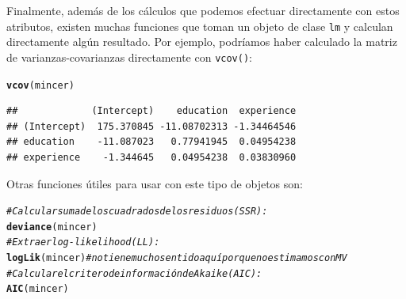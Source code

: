 \documentclass{article}\usepackage[]{graphicx}\usepackage[]{color}
\makeatletter
\newcommand{\hlcom}[1]{\textcolor[rgb]{0.678,0.584,0.686}{\textit{#1}}}%
\newcommand{\hlstd}[1]{\textcolor[rgb]{0.345,0.345,0.345}{#1}}%
\newcommand{\hlkwd}[1]{\textcolor[rgb]{0.737,0.353,0.396}{\textbf{#1}}}%
\newenvironment{kframe}{%
 \def\at@end@of@kframe{}%
 \ifinner\ifhmode%
  \def\at@end@of@kframe{\end{minipage}}%
  \begin{minipage}{\columnwidth}%
 \fi\fi%
 \def\FrameCommand##1{\hskip\@totalleftmargin \hskip-\fboxsep
 \colorbox{shadecolor}{##1}\hskip-\fboxsep
     \hskip-\linewidth \hskip-\@totalleftmargin \hskip\columnwidth}%
 \MakeFramed {\advance\hsize-\width
   \@totalleftmargin\z@ \linewidth\hsize
   \@setminipage}}%
 {\par\unskip\endMakeFramed%
 \at@end@of@kframe}
\newenvironment{knitrout}{}{} %
\makeatother
\begin{document}
Finalmente, además de los cálculos que podemos efectuar directamente con estos atributos, existen muchas funciones que toman un objeto de clase \verb|lm| y calculan directamente algún resultado. Por ejemplo, podríamos haber calculado la matriz de varianzas-covarianzas directamente con \verb|vcov()|:

\begin{knitrout}
\color{fgcolor}\begin{kframe}
\begin{alltt}
\hlkwd{vcov}\hlstd{(mincer)}
\end{alltt}
\begin{verbatim}
##             (Intercept)    education  experience
## (Intercept)  175.370845 -11.08702313 -1.34464546
## education    -11.087023   0.77941945  0.04954238
## experience    -1.344645   0.04954238  0.03830960
\end{verbatim}
\end{kframe}
\end{knitrout}

Otras funciones útiles para usar con este tipo de objetos son:

\begin{knitrout}
\color{fgcolor}\begin{kframe}
\begin{alltt}
\hlcom{# Calcular suma de los cuadrados de los residuos (SSR):}
\hlkwd{deviance}\hlstd{(mincer)}
\hlcom{# Extraer log-likelihood (LL):}
\hlkwd{logLik}\hlstd{(mincer)} \hlcom{# no tiene mucho sentido aquí porque no estimamos con MV}
\hlcom{# Calcular el critero de información de Akaike (AIC):}
\hlkwd{AIC}\hlstd{(mincer)}
\end{alltt}
\end{kframe}
\end{knitrout}
\end{document}
